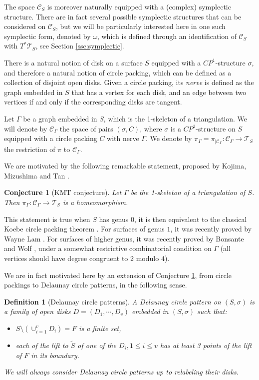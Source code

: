 \documentclass[notitlepage,twoside,a4paper]{amsart}
\newtheorem{conjecture}[theorem]{\rm\bf Conjecture}
\newtheorem{definition}[theorem]{\rm\bf Definition}
\theoremstyle{named}
\newcommand{\cC}{{\mathcal C}}
\newcommand{\cT}{{\mathcal T}}
\begin{document}
The space $\cC_S$ is moreover naturally equipped with a (complex) symplectic structure. There are in fact several possible symplectic structures that can be considered on $\cC_S$, but we will be particularly interested here in one such symplectic form, denoted by $\omega$, which is defined through an identification of $\cC_S$ with $T^*\cT_S$, see Section \ref{ssc:symplectic}. 

There is a natural notion of disk on a surface $S$ equipped with a $CP^1$-structure $\sigma$, and therefore a natural notion of circle packing, which can be defined as a collection of disjoint open disks. Given a circle packing, its {\em nerve} is defined as the graph embedded in $S$ that has a vertex for each disk, and an edge between two vertices if and only if the corresponding disks are tangent. 

Let $\Gamma$ be a graph embedded in $S$, which is the 1-skeleton of a triangulation. We will denote by $\cC_\Gamma$ the space of pairs $(\sigma, C)$, where $\sigma$ is a $CP^1$-structure on $S$ equipped with a circle packing $C$ with nerve $\Gamma$. We denote by $\pi_\Gamma=\pi_{|\cC_\Gamma}:\cC_\Gamma\to \cT_S$ the restriction of $\pi$ to $\cC_\Gamma$.

We are motivated by the following remarkable statement, proposed by Kojima, Mizushima and Tan \cite{KMT,KMT2,KMT3}.

\begin{conjecture}[KMT conjecture] \label{cj:kmt}
  Let $\Gamma$ be the 1-skeleton of a triangulation of $S$. Then $\pi_\Gamma:\cC_\Gamma\to \cT_S$ is a homeomorphism.
\end{conjecture}

This statement is true when $S$ has genus $0$, it is then equivalent to the classical Koebe circle packing theorem \cite{koebe}. For surfaces of genus $1$, it was recently proved by Wayne Lam \cite{lam2019quadratic,lam2024space}. For surfaces of higher genus, it was recently proved by Bonsante and Wolf \cite{bonsante-wolf:conformal}, under a somewhat restrictive combinatorial condition on $\Gamma$ (all vertices should have degree congruent to $2$ modulo $4$). 

We are in fact motivated here by an extension of Conjecture \ref{cj:kmt}, from circle packings to Delaunay circle patterns, in the following sense.

\begin{definition}[Delaunay circle patterns]
  A {\em Delaunay circle pattern} on $(S, \sigma)$ is a family of open disks $D=(D_1,\cdots, D_v)$ embedded in $(S,\sigma)$ such that:
  \begin{itemize}
  \item $S\setminus(\cup_{i=1}^v D_i)=F$ is a finite set,
  \item each of the lift to $\tilde S$ of one of the $D_i, 1\leq i\leq v$ has at least 3 points of the lift of $F$ in its boundary.
  \end{itemize}
  We will always consider Delaunay circle patterns up to relabeling their disks.
\end{definition}
\end{document}
